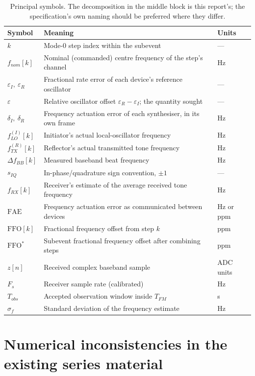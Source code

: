\documentclass[11pt,a4paper]{article}
\newcommand{\FFO}{\mathrm{FFO}}
\newcommand{\FAE}{\mathrm{FAE}}
\newcommand{\Tfm}{T_{FM}}
\begin{document}
\begin{table}[h]
\caption{Principal symbols. The decomposition in the middle block is this report's; the
specification's own naming should be preferred where they differ.}
\label{tab:symbols}
\centering\small
\begin{tabular}{@{}L{26mm}L{80mm}L{22mm}@{}}
\toprule
Symbol & Meaning & Units \\
\midrule
$k$ & Mode-0 step index within the subevent & --- \\
$f_{nom}[k]$ & Nominal (commanded) centre frequency of the step's channel & Hz \\
$\varepsilon_I,\ \varepsilon_R$ & Fractional rate error of each device's reference oscillator & --- \\
$\varepsilon$ & Relative oscillator offset $\varepsilon_R-\varepsilon_I$; the quantity sought & --- \\
$\delta_I,\ \delta_R$ & Frequency actuation error of each synthesiser, in its own frame & Hz \\
$f_{LO}^{(I)}[k]$ & Initiator's actual local-oscillator frequency & Hz \\
$f_{TX}^{(R)}[k]$ & Reflector's actual transmitted tone frequency & Hz \\
$\Delta f_{BB}[k]$ & Measured baseband beat frequency & Hz \\
$s_{IQ}$ & In-phase/quadrature sign convention, $\pm1$ & --- \\
$f_{RX}[k]$ & Receiver's estimate of the average received tone frequency & Hz \\
$\FAE$ & Frequency actuation error as communicated between devices & Hz or ppm \\
$\FFO[k]$ & Fractional frequency offset from step $k$ & ppm \\
$\FFO^{*}$ & Subevent fractional frequency offset after combining steps & ppm \\
$z[n]$ & Received complex baseband sample & ADC units \\
$F_s$ & Receiver sample rate (calibrated) & Hz \\
$T_{obs}$ & Accepted observation window inside $\Tfm$ & s \\
$\sigma_f$ & Standard deviation of the frequency estimate & Hz \\
\bottomrule
\end{tabular}
\end{table}

\section{Numerical inconsistencies in the existing series material}
\label{sec:discrepancies}
\end{document}
